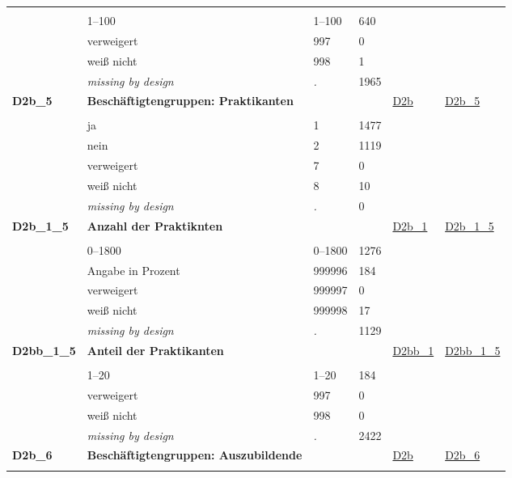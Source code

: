 \begin{longtable}{| L{2.45cm} | L{6cm} | C{1.5cm} | R{1cm} | C{2.25cm} | C{2.25cm} |}
   &  &  &  &  &  \\ 
   & 1--100 & 1--100 & 640 &  &  \\ 
   & verweigert & 997 & 0 &  &  \\ 
   & weiß nicht & 998 & 1 &  &  \\ 
   & \textit{missing by design} & \textit{.} & 1965 &  &  \\ 
   \midrule
\textbf{D2b\_5}\label{var:D2b:5} & \textbf{Beschäftigtengruppen: Praktikanten} &  &  & \hyperref[D2b]{D2b} & \hyperref[var:suf:D2b:5]{D2b\_5} \\ 
   &  &  &  &  &  \\ 
   & ja & 1 & 1477 &  &  \\ 
   & nein & 2 & 1119 &  &  \\ 
   & verweigert & 7 & 0 &  &  \\ 
   & weiß nicht & 8 & 10 &  &  \\ 
   & \textit{missing by design} & \textit{.} & 0 &  &  \\ 
   \midrule
\textbf{D2b\_1\_5}\label{var:D2b:1:5} & \textbf{Anzahl der Praktiknten} &  &  & \hyperref[D2b:1]{D2b\_1} & \hyperref[var:suf:D2b:1:5]{D2b\_1\_5} \\ 
   &  &  &  &  &  \\ 
   & 0--1800 & 0--1800 & 1276 &  &  \\ 
   & Angabe in Prozent & 999996 & 184 &  &  \\ 
   & verweigert & 999997 & 0 &  &  \\ 
   & weiß nicht & 999998 & 17 &  &  \\ 
   & \textit{missing by design} & \textit{.} & 1129 &  &  \\ 
   \midrule
\textbf{D2bb\_1\_5}\label{var:D2bb:1:5} & \textbf{Anteil der Praktikanten} &  &  & \hyperref[D2bb:1]{D2bb\_1} & \hyperref[var:suf:D2bb:1:5]{D2bb\_1\_5} \\ 
   &  &  &  &  &  \\ 
   & 1--20 & 1--20 & 184 &  &  \\ 
   & verweigert & 997 & 0 &  &  \\ 
   & weiß nicht & 998 & 0 &  &  \\ 
   & \textit{missing by design} & \textit{.} & 2422 &  &  \\ 
   \midrule
\textbf{D2b\_6}\label{var:D2b:6} & \textbf{Beschäftigtengruppen: Auszubildende} &  &  & \hyperref[D2b]{D2b} & \hyperref[var:suf:D2b:6]{D2b\_6} \\ 
   &  &  &  &  &  \\ 

\end{longtable}
